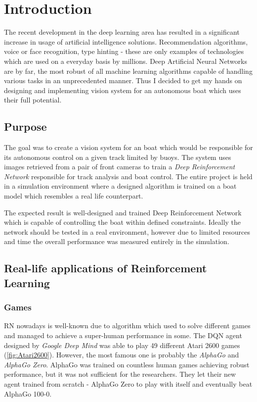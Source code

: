 \chapter{Introduction}
\label{cha:introduction}

The recent development in the deep learning area has resulted in a significant increase in usage of artificial intelligence solutions. Recommendation algorithms, voice or face recognition, type hinting - these are only examples of technologies which are used on a everyday basis by millions. Deep Artificial Neural Networks are by far, the most robust of all machine learning algorithms capable of handling various tasks in an unprecedented manner. Thus I decided to get my hands on designing and implementing vision system for an autonomous boat which uses their full potential.

\section{Purpose}
\label{sec:purpose}

The goal was to create a vision system for an boat which would be responsible for its autonomous control on a given track limited by buoys. The system uses images retrieved from a pair of front cameras to train a \emph{Deep Reinforcement Network} responsible for track analysis and boat control. The entire project is held in a simulation environment where a designed algorithm is trained on a boat model which resembles a real life counterpart. 

The expected result is well-designed and trained Deep Reinforcement Network which is capable of controlling the boat within defined constraints. Ideally the network should be tested in a real environment, however due to limited resources and time the overall performance was measured entirely in the simulation.

\section{Real-life applications of Reinforcement Learning}
\label{sec:real-life-applications-of-deep-learning}

\subsection{Games}
\label{sub:intro-games}
RN nowadays is well-known due to algorithm which used to solve different games and managed to achieve a super-human performance in some.
The DQN agent designed by \emph{Google Deep Mind} was able to play 49 different Atari 2600 games (\ref{fig:Atari2600}). However, the most famous one is probably the \emph{AlphaGo} \cite{AlphaGO}  and \emph{AlphaGo Zero}. AlphaGo was trained on countless human games achieving robust performance, but it was not sufficient for the researchers. They let their new agent trained from scratch - AlphaGo Zero to play with itself and eventually beat AlphaGo 100-0. 

